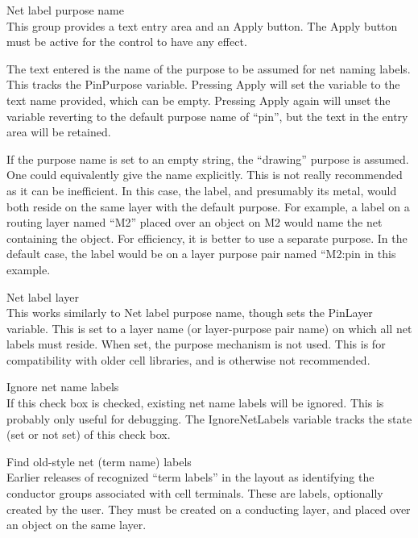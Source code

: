 \begin{description}
\item{\cb Net label purpose name}\\
This group provides a text entry area and an {\cb Apply} button.  The
{\cb Apply} button must be active for the control to have any effect.

The text entered is the name of the purpose to be assumed for net
naming labels.  This tracks the {\et PinPurpose} variable.  Pressing
{\cb Apply} will set the variable to the text name provided, which can
be empty.  Pressing {\cb Apply} again will unset the variable
reverting to the default purpose name of ``{\vt pin}'', but the text
in the entry area will be retained.

If the purpose name is set to an empty string, the ``{\vt drawing}''
purpose is assumed.  One could equivalently give the name explicitly. 
This is not really recommended as it can be inefficient.  In this
case, the label, and presumably its metal, would both reside on the
same layer with the default purpose.  For example, a label on a
routing layer named ``{\vt M2}'' placed over an object on {\vt M2}
would name the net containing the object.  For efficiency, it is
better to use a separate purpose.  In the default case, the label
would be on a layer purpose pair named ``{\vt M2:pin} in this example.

\item{\cb Net label layer}\\
This works similarly to {\cb Net label purpose name}, though sets the
{\et PinLayer} variable.  This is set to a layer name (or
layer-purpose pair name) on which all net labels must reside.  When
set, the purpose mechanism is not used.  This is for compatibility
with older cell libraries, and is otherwise not recommended.

\item{\cb Ignore net name labels}\\
If this check box is checked, existing net name labels will be
ignored.  This is probably only useful for debugging.  The {\et
IgnoreNetLabels} variable tracks the state (set or not set) of this
check box.

\item{\cb Find old-style net (term name) labels}\\
Earlier releases of {\Xic} recognized ``term labels'' in the layout as
identifying the conductor groups associated with cell terminals. 
These are labels, optionally created by the user.  They must be
created on a conducting layer, and placed over an object on the same
layer.


\end{description}
